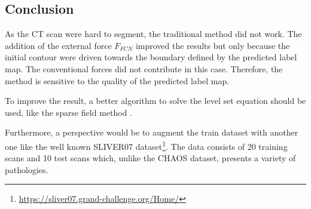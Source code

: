 \documentclass[a4paper, 11pt]{article}
\begin{document}
\subsection{Conclusion}
As the CT scan were hard to segment, the traditional method did not work. The addition of the external force $F_{FCN}$ improved the results but only because the initial contour were driven towards the boundary defined by the predicted label map. The conventional forces did not contribute in this case. Therefore, the method is sensitive to the quality of the predicted label map. 

To improve the result, a better algorithm to solve the level set equation should be used, like the sparse field method \cite{whitaker_level-set_1998}.

Furthermore, a perspective would be to augment the train dataset with another one like the well known SLIVER07 dataset\footnote{\url{https://sliver07.grand-challenge.org/Home/}}. The data consists of 20 training scans and 10 test scans which, unlike the CHAOS dataset, presents a variety of pathologies.

\printbibliography
\end{document}
